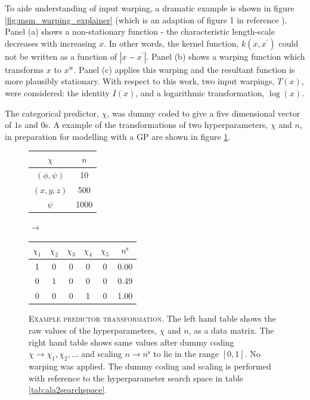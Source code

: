 To aide understanding of input warping, a dramatic example is shown in figure \ref{fig:msm_warping_explainer} (which is an adaption of figure 1 in reference \cite{snoekInputWarpingBayesian2014a}). Panel (a) shows a non-stationary function - the characteristic length-scale decreases with increasing $x$. In other words, the kernel function, $k(x, x^{\prime})$ could not be written as a function of $|x-x^{\prime}|$. Panel (b) shows a warping function which transforms $x$ to $x^{\mathrm{w}}$. Panel (c) applies this warping and the resultant function is more plausibly stationary. With respect to this work, two input warpings, $T(x)$, were considered: the identity $I(x)$, and a logarithmic transformation, $\log(x)$.  

The categorical predictor, $\chi$, was dummy coded \cite{dalyDummyCodingVs2016} to give a five dimensional vector of $1$s and $0$s.  A example of the transformations of two hyperparameters, $\chi$ and $n$, in preparation for modelling with a GP are shown in figure \ref{fig:msm_eg_transform}. 

\begin{figure}
    \centering
    \caption[Example predictor transformation]{\textsc{Example predictor transformation}. The left hand table shows the raw values of the hyperparameters, $\chi$ and $n$, as a data matrix. The right hand table shows same values after dummy coding $\chi \rightarrow \chi_{1}, \chi_{2}, \ldots$ and scaling $n\rightarrow n^{\mathrm{s}}$ to lie in the range $[0, 1]$. No warping was applied. The dummy coding and scaling is performed with reference to the hyperparameter search space in table \ref{tab:ala2searchspace}.}
    \begin{tabular}{cc}
        \toprule
        $\chi$    &  $n$ \\
        \midrule
        $(\phi, \psi)$    &  10 \\
        $(x, y, z)$ & 500 \\
        $\psi$  & 1000 \\
        \bottomrule
        \end{tabular}
    $\longrightarrow $
    \begin{tabular}{cccccc}
        \toprule
        $\chi_{1}$ &$\chi_{2}$ &$\chi_{3}$ &$\chi_{4}$ &$\chi_{5}$ &  $n^{\mathrm{s}}$ \\
        \midrule
        1 & 0 & 0 & 0 & 0  &  \num{0.00} \\
        0 & 1 & 0 & 0 & 0  &  \num{0.49} \\
        0 & 0 & 0 & 1 & 0  &  \num{1.00} \\
        \bottomrule
    \end{tabular} 
    \label{fig:msm_eg_transform}
\end{figure}

